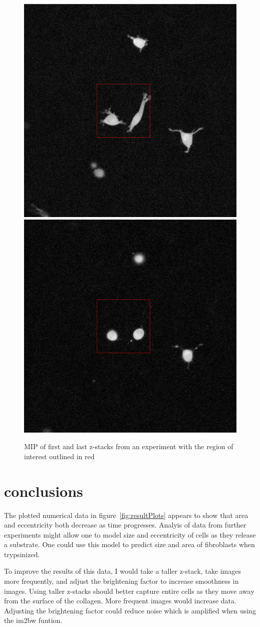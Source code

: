 \documentclass[twocolumn,notitlepage]{revtex4-1}
\begin{document}
\begin{figure}[h!]
\includegraphics[width=.2\textwidth]{img/0-first-full.png}
\includegraphics[width=.2\textwidth]{img/0-last-full.png}
\caption{\label{fig:0-full}MIP of first and last z-stacks from an experiment with the region of interest outlined in red}
\end{figure}

\section*{conclusions}
The plotted numerical data in figure~\ref{fig:resultPlots} appears to show that area and eccentricity both decrease as time progresses. Analyis of data from further experiments might allow one to model size and eccentricity of cells as they release a substrate. One could use this model to predict size and area of fibroblasts when trypsinized.

To improve the results of this data, I would take a taller z-stack, take images more frequently, and adjust the brightening factor to increase smoothness in images. Using taller z-stacks should better capture entire cells as they move away from the surface of the collagen. More frequent images would increase data. Adjusting the brightening factor could reduce noise which is amplified when using the im2bw funtion.

%
\end{document}
